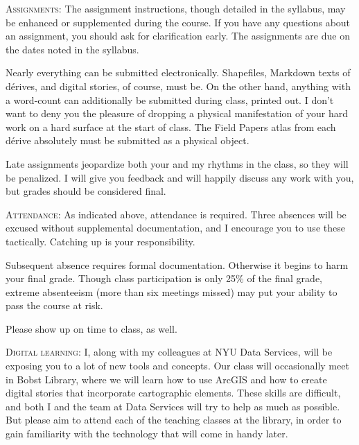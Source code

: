 \begin{description}

  \item \textsc{Assignments:} The assignment instructions, though detailed in
    the syllabus, may be enhanced or supplemented during the course. If you
    have any questions about an assignment, you should ask for clarification
    early. The assignments are due on the dates noted in the syllabus. 
    
    Nearly everything can be submitted electronically. Shapefiles, Markdown
    texts of dérives, and digital stories, of course, must be. On the other
    hand, anything with a word-count can additionally be submitted during
    class, printed out. I don’t want to deny you the pleasure of dropping a
    physical manifestation of your hard work on a hard surface at the start of
    class. The Field Papers atlas from each dérive absolutely must be submitted
    as a physical object. 
    
    Late assignments jeopardize both your and my rhythms in the class, so they
    will be penalized. I will give you feedback and will happily discuss any
    work with you, but grades should be considered final.

  \item \textsc{Attendance:} As indicated above, attendance is required. Three
    absences will be excused without supplemental documentation, and I
    encourage you to use these tactically. Catching up is your responsibility.

    Subsequent absence requires formal documentation. Otherwise it begins to
    harm your final grade. Though class participation is only 25\% of the final
    grade, extreme absenteeism (more than six meetings missed) may put your
    ability to pass the course at risk.

    Please show up on time to class, as well.

  \item \textsc{Digital learning:} I, along with my colleagues at NYU Data
    Services, will be exposing you to a lot of new tools and concepts. Our
    class will occasionally meet in Bobst Library, where we will learn how to
    use ArcGIS and how to create digital stories that incorporate cartographic
    elements. These skills are difficult, and both I and the team at Data
    Services will try to help as much as possible. But please aim to attend
    each of the teaching classes at the library, in order to gain familiarity
    with the technology that will come in handy later.


\end{description}
